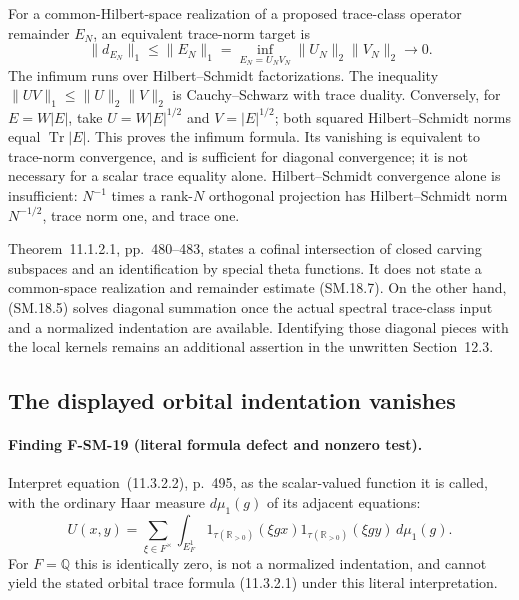 For a common-Hilbert-space realization of a proposed trace-class
operator remainder $E_N$, an equivalent trace-norm target is
\[
 \|d_{E_N}\|_1\leq\|E_N\|_1
   =\inf_{E_N=U_NV_N}\|U_N\|_2\|V_N\|_2\longrightarrow0.
 \tag{SM.18.7}
\]
The infimum runs over Hilbert--Schmidt factorizations.
The inequality $\|UV\|_1\leq\|U\|_2\|V\|_2$ is
Cauchy--Schwarz with trace duality.  Conversely, for
$E=W|E|$, take $U=W|E|^{1/2}$ and $V=|E|^{1/2}$;
both squared Hilbert--Schmidt norms equal $\operatorname{Tr}|E|$.
This proves the infimum formula.  Its vanishing is equivalent
to trace-norm convergence, and is sufficient for diagonal
convergence; it is not necessary for a scalar trace equality alone.
Hilbert--Schmidt convergence alone is insufficient: $N^{-1}$
times a rank-$N$ orthogonal projection has Hilbert--Schmidt norm
$N^{-1/2}$, trace norm one, and trace one.

Theorem~11.1.2.1, pp.~480--483, states a cofinal intersection
of closed carving subspaces and an identification by special
theta functions.  It does not state a common-space realization
and remainder estimate (SM.18.7).  On the other hand,
(SM.18.5) solves diagonal summation once the actual spectral
trace-class input and a normalized indentation are available.
Identifying those diagonal pieces with the local kernels remains
an additional assertion in the unwritten Section~12.3.

\subsection{The displayed orbital indentation vanishes}

\paragraph{Finding F-SM-19 (literal formula defect and nonzero test).}
Interpret equation~(11.3.2.2), p.~495, as the scalar-valued
function it is called, with the ordinary Haar measure
$d\mu_1(g)$ of its adjacent equations:
\[
 U(x,y)=\sum_{\xi\in F^\times}\int_{E_F^1}
   1_{\tau(\mathbb R_{>0})}(\xi gx)
   1_{\tau(\mathbb R_{>0})}(\xi gy)\,d\mu_1(g).
 \tag{SM.19.1}
\]
For $F=\mathbb Q$ this is identically zero, is not a normalized
indentation, and cannot yield the stated orbital trace formula
(11.3.2.1) under this literal interpretation.

